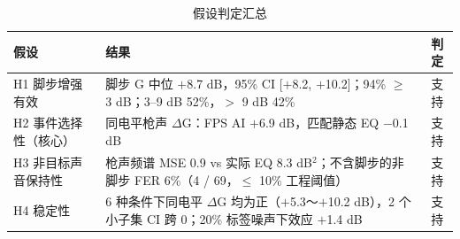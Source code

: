 \begin{table}[htbp]\centering
\caption{假设判定汇总}\label{tab:verdict}
{\small\begin{threeparttable}
\begin{tabularx}{\linewidth}{lLc}\toprule
假设 & 结果 & 判定 \\
\midrule
H1 脚步增强有效 & 脚步 G 中位 $+$8.7 dB，95\% CI [$+$8.2, $+$10.2]；94\% $\geq$ 3 dB；3--9 dB 52\%，$>$ 9 dB 42\% & 支持 \\
H2 事件选择性（核心） & 同电平枪声 $\Delta$G：FPS AI $+$6.9 dB，匹配静态 EQ $-$0.1 dB & 支持 \\
H3 非目标声音保持性 & 枪声频谱 MSE 0.9 vs 实际 EQ 8.3 dB$^{2}$；不含脚步的非脚步 FER 6\%（4 / 69，$\leq$ 10\% 工程阈值） & 支持 \\
H4 稳定性 & 6 种条件下同电平 $\Delta$G 均为正（$+$5.3～$+$10.2 dB），2 个小子集 CI 跨 0；20\% 标签噪声下效应 $+$1.4 dB & 支持 \\
\bottomrule\end{tabularx}
\end{threeparttable}}
\end{table}
